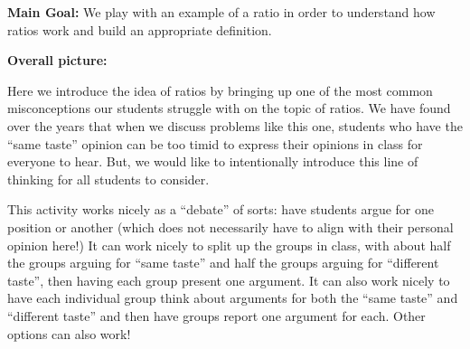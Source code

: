 \documentclass[nooutcomes,noauthor,handout]{ximera}
\begin{document}
\newpage
\begin{instructorNotes}

{\bf Main Goal:} We play with an example of a ratio in order to understand how ratios work and build an appropriate definition.

{\bf Overall picture:}

Here we introduce the idea of ratios by bringing up one of the most common misconceptions our students struggle with on the topic of ratios.  We have found over the years that when we discuss problems like this one, students who have the ``same taste'' opinion can be too timid to express their opinions in class for everyone to hear.  But, we would like to intentionally introduce this line of thinking for all students to consider.

This activity works nicely as a ``debate'' of sorts: have students argue for one position or another (which does not necessarily have to align with their personal opinion here!) It can work nicely to split up the groups in class, with about half the groups arguing for ``same taste'' and half the groups arguing for ``different taste'', then having each group present one argument. It can also work nicely to have each individual group think about arguments for both the ``same taste'' and ``different taste'' and then have groups report one argument for each. Other options can also work!



\end{instructorNotes}
\end{document}
